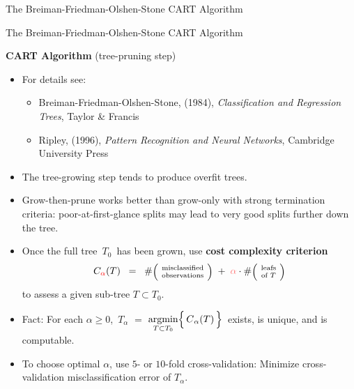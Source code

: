 \begin{frame}{\vskip -0.2cm \large The Breiman-Friedman-Olshen-Stone CART Algorithm}
\begin{multicols}{2}
\end{multicols}

\end{frame}
\normalsize


\begin{frame}{\vskip -0.2cm \large The Breiman-Friedman-Olshen-Stone CART Algorithm}

\Large
\textbf{CART Algorithm} (tree-pruning step)

\vskip 0.1cm
\scriptsize
\begin{itemize}
\pause
\item
	For details see:
	\vskip -0.2cm
	{\tiny\begin{itemize}
	\item
		{\tiny Breiman-Friedman-Olshen-Stone, (1984),
		\textit{Classification and Regression Trees}, Taylor \& Francis}
	\item
		\vskip -0.1cm
		{\tiny Ripley, (1996),
		\textit{Pattern Recognition and Neural Networks}, Cambridge University Press}
	\end{itemize}}
\pause
\item
	The tree-growing step tends to produce overfit trees.
\pause
\item
	Grow-then-prune works better than grow-only with strong termination criteria:
	poor-at-first-glance splits may lead to very good splits further down the tree.
\pause
\item
	Once the full tree \,$T_{0}$\, has been grown, use \textbf{cost complexity criterion}
	\vskip -0.1cm
	\begin{equation*}
	C_{{\color{red}\alpha}}(T) \;\; = \;\;
		\#\textnormal{\scriptsize$\left(\!\begin{array}{c}
			\textnormal{misclassified}
			\\
			\textnormal{observations}
		\end{array}\!\right)$}
		\; + \;
		{\color{lightRed}\alpha} \cdot
		\#\textnormal{\scriptsize$\left(\!\begin{array}{c}
			\textnormal{leafs}
			\\
			\textnormal{of $T$}
		\end{array}\!\right)$}
	\end{equation*}
	\vskip -0.1cm
	to assess a given sub-tree $T \subset T_{0}$.
\item
	Fact:
	{\color{red}For each $\alpha \geq 0$,
	\,$T_{\alpha}$ $=$
	$\underset{T \subset T_{0}}{\textnormal{argmin}}\!\left\{\,\overset{{\color{white}.}}{C}_{\alpha}(T)\,\right\}$\,
	exists, is unique, and is computable.}
\item
	To choose optimal $\alpha$, use $5$- or $10$-fold cross-validation:
	Minimize cross-validation misclassification error of $T_{\alpha}$.
\end{itemize}

\end{frame}
\normalsize

